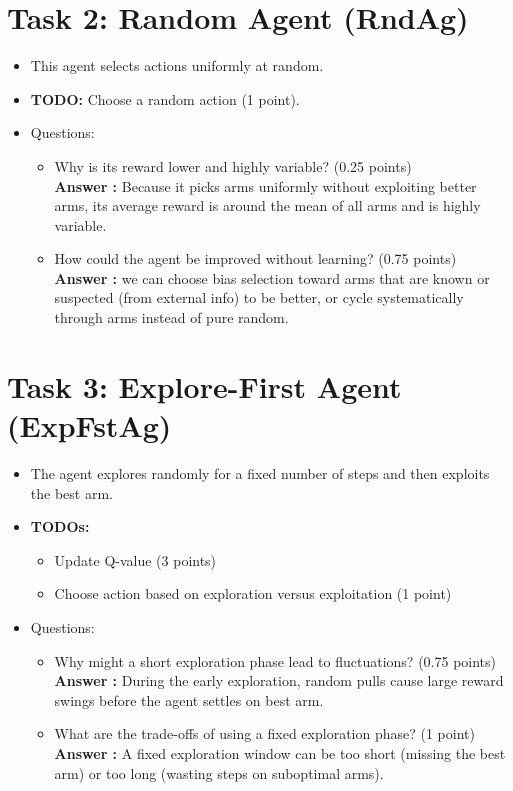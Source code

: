 \documentclass[12pt]{article}
\begin{document}
{{{\section{Task 2: Random Agent (RndAg)}
\begin{itemize}[noitemsep]
    \item This agent selects actions uniformly at random.
    \item \textbf{TODO:} Choose a random action (1 point).
    \item Questions:
    \begin{itemize}[noitemsep]
        \item Why is its reward lower and highly variable? (0.25 points)\\
        \textbf{Answer :} Because it picks arms uniformly without exploiting better arms, its average reward is around the mean of all arms and is highly variable.
        \item How could the agent be improved without learning? (0.75 points)\\
        \textbf{Answer :} we can choose bias selection toward arms that are known or suspected (from external info) to be better, or cycle systematically through arms instead of pure random.
    \end{itemize}
\end{itemize}

\section{Task 3: Explore-First Agent (ExpFstAg)}
\begin{itemize}[noitemsep]
    \item The agent explores randomly for a fixed number of steps and then exploits the best arm.
    \item \textbf{TODOs:}
    \begin{itemize}[noitemsep]
        \item Update Q-value (3 points)
        \item Choose action based on exploration versus exploitation (1 point)
    \end{itemize}
    \item Questions:
    \begin{itemize}[noitemsep]
        \item Why might a short exploration phase lead to fluctuations? (0.75 points)\\
        \textbf{Answer :} During the early exploration, random pulls cause large reward swings before the agent settles on best arm.
        \item What are the trade-offs of using a fixed exploration phase? (1 point)\\
        \textbf{Answer :} A fixed exploration window can be too short (missing the best arm) or too long (wasting steps on suboptimal arms).
    \end{itemize}
\end{itemize}

}}}
\end{document}
